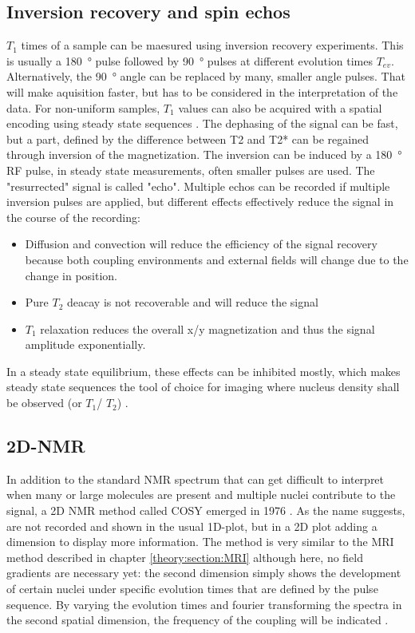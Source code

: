        \subsection{Inversion recovery and spin echos}
            $T_1$ times of a sample can be maesured using inversion recovery experiments. This is usually a \SI{180}{\degree} pulse followed by \SI{90}{\degree} pulses at different evolution times $T_{ev}$. Alternatively, the \SI{90}{\degree} angle can be replaced by many, smaller angle pulses. That will make aquisition faster, but has to be considered in the interpretation of the data. For non-uniform samples, $T_1$ values can also be acquired with a spatial encoding using steady state sequences \cite{scheffler_t1_2001}.
            The dephasing of the signal can be fast, but a part, defined by the difference between T2 and T2* can be regained through inversion of the magnetization. The inversion can be induced by a \SI{180}{\degree} RF pulse, in steady state measurements, often smaller pulses are used. The "resurrected" signal is called "echo". Multiple echos can be recorded if multiple inversion pulses are applied, but different effects effectively reduce the signal in the course of the recording:
            \begin{itemize}
                \item Diffusion and convection will reduce the efficiency of the signal recovery because both coupling environments and external fields will change due to the change in position.
                \item Pure $T_2$ deacay is not recoverable and will reduce the signal
                \item $T_1$ relaxation reduces the overall x/y magnetization and thus the signal amplitude exponentially.
            \end{itemize}
            In a steady state equilibrium, these effects can be inhibited mostly, which makes steady state sequences the tool of choice for imaging where nucleus density shall be observed (or $T_1$/ $T_2$) \cite{nitz_contrast_1999}.
        \subsection{2D-NMR}
        In addition to the standard NMR spectrum that can get difficult to interpret when many or large molecules are present and multiple nuclei contribute to the signal, a 2D NMR method called COSY emerged in 1976 \cite{}. As the name suggests, are not recorded and shown in the usual 1D-plot, but in a 2D plot adding a dimension to display more information. The method is very similar to the MRI method described in chapter \ref{theory:section:MRI} although here, no field gradients are necessary yet: the second dimension simply shows the development of certain nuclei under specific evolution times that are defined by the pulse sequence. By varying the evolution times and fourier transforming the spectra in the second spatial dimension, the frequency of the coupling will be indicated \cite{finster_two-dimensional_1980}.
